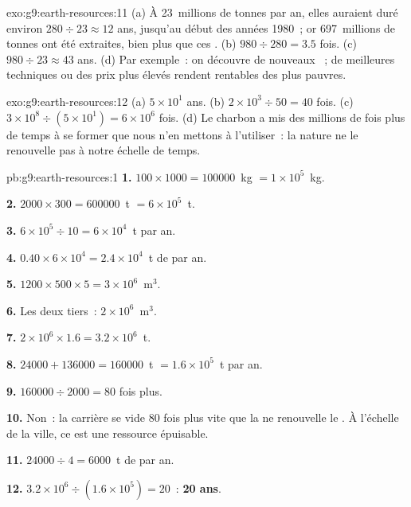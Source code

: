 \begin{solution}{exo:g9:earth-resources:11}
(a) À 23~millions de tonnes par an, elles auraient duré environ $280 \div 23
\approx 12$ ans, jusqu'au début des années 1980~; or 697~millions de
tonnes ont été extraites, bien plus que ces . (b) $980 \div 280 = 3.5$
fois. (c) $980 \div
23 \approx 43$ ans. (d) Par exemple~: on découvre de nouveaux ~;
de meilleures techniques ou des prix plus élevés rendent rentables des
 plus pauvres.
\end{solution}

\begin{solution}{exo:g9:earth-resources:12}
(a) $5 \times 10^1$ ans. (b) $2 \times 10^3 \div 50 = 40$ fois. (c) $3
\times 10^8 \div (5 \times 10^1) = 6 \times 10^6$ fois. (d) Le charbon a
mis des millions de fois plus de temps à se former que nous n'en mettons à
l'utiliser~: la nature ne le renouvelle pas à notre échelle de temps.
\end{solution}

\begin{solution}{pb:g9:earth-resources:1}
\textbf{1.} $100 \times 1000 = \num{100000}$~kg $= 1 \times 10^5$~kg.

\textbf{2.} $2000 \times 300 = \num{600000}$~t $= 6 \times 10^5$~t.

\textbf{3.} $6 \times 10^5 \div 10 = 6 \times 10^4$~t par an.

\textbf{4.} $0.40 \times 6 \times 10^4 = 2.4 \times 10^4$~t de  par
an.

\textbf{5.} $1200 \times 500 \times 5 = 3 \times 10^6$~m$^3$.

\textbf{6.} Les deux tiers~: $2 \times 10^6$~m$^3$.

\textbf{7.} $2 \times 10^6 \times 1.6 = 3.2 \times 10^6$~t.

\textbf{8.} $\num{24000} + \num{136000} = \num{160000}$~t $= 1.6 \times
10^5$~t par an.

\textbf{9.} $\num{160000} \div 2000 = 80$ fois plus.

\textbf{10.} Non~: la carrière se vide 80 fois plus vite que la  ne
renouvelle le . À l'échelle de la ville, ce  est une ressource
épuisable.

\textbf{11.} $\num{24000} \div 4 = \num{6000}$~t de  par an.

\textbf{12.} $3.2 \times 10^6 \div (1.6 \times 10^5) = 20$~: \textbf{20 ans}.
\end{solution}
